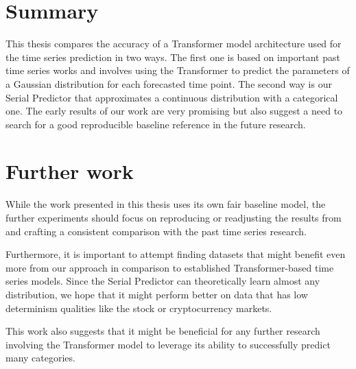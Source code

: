 \documentclass[en]{pracamgr}
\begin{document}
	\section{Summary}
	
	This thesis compares the accuracy of a Transformer model architecture used for the time series prediction in two ways. The first one is based on important past time series works and involves using the Transformer to predict the parameters of a Gaussian distribution for each forecasted time point. The second way is our Serial Predictor that approximates a continuous distribution with a categorical one. The early results of our work are very promising but also suggest a need to search for a good reproducible baseline reference in the future research.
	
	\section{Further work}
	
	While the work presented in this thesis uses its own fair baseline model, the further experiments should focus on reproducing or readjusting the results from \cite{enhancing} and crafting a consistent comparison with the past time series research.
	
	Furthermore, it is important to attempt finding datasets that might benefit even more from our approach in comparison to established Transformer-based time series models. Since the Serial Predictor can theoretically learn almost any distribution, we hope that it might perform better on data that has low determinism qualities like the stock or cryptocurrency markets.
	
	This work also suggests that it might be beneficial for any further research involving the Transformer model to leverage its ability to successfully predict many categories.
	
\end{document}
